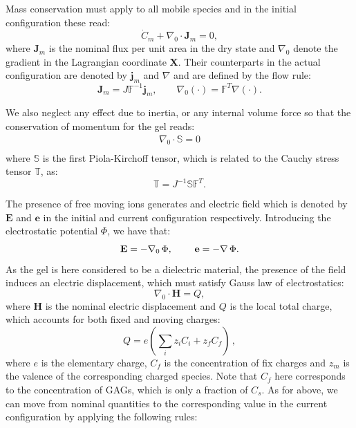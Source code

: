 \documentclass[runningheads]{llncs}
\newcommand{\F}{\ensuremath{\mathbb{F}}}
\begin{document}
Mass conservation must apply to all mobile species and in the initial configuration these read:
\begin{equation}
\dot{C}_m + \nabla_0 \cdot \mathbf{J}_m = 0, 
\end{equation}
where $\mathbf{J}_m$ is the nominal flux per unit area in the dry state and $\nabla_0$ denote the gradient in the Lagrangian coordinate $\mathbf{X}$. Their counterparts in the actual configuration are denoted by $\mathbf{j}_m$ and $\nabla$ and are defined by the flow rule:
\begin{equation}
\mathbf{J}_m = J \F^{-1} \mathbf{j}_m, \qquad \nabla_0 (\cdot) = \F^{T} \nabla(\cdot).
\end{equation}

We also neglect any effect due to inertia, or any internal volume force so that the conservation of momentum for the gel reads:
\begin{gather}
\nabla_0 \cdot \mathbb{S}=0\\
\end{gather}
where $\mathbb{S}$ is the first Piola-Kirchoff tensor, which is related to the Cauchy stress tensor $\mathbb{T}$, as:
\begin{equation}
\mathbb{T} = J^{-1}\mathbb{S}\F^T.
\end{equation}

The presence of free moving ions generates and electric field which is denoted by $\mathbf{E}$ and $\mathbf{e}$ in the initial and current configuration respectively. Introducing the electrostatic potential $\Phi$, we have that:
\begin{equation}
\mathbf{E}= -\nabla_0 \, \Phi, \hspace{8mm} \mathbf{e}= - \nabla \, \Phi.
\end{equation}
As the gel is here considered to be a dielectric material, the presence of the field induces an electric displacement, which must satisfy Gauss law of electrostatics:
\begin{equation}
\nabla_0 \cdot \mathbf{H}= Q,
\label{gauss}
\end{equation}
where $\mathbf{H}$ is the nominal electric displacement and $Q$ is the local total charge, which accounts for both fixed and moving charges:
\begin{equation}
Q = e\left(\sum\limits_{i} z_i C_i+z_f C_{f}\right)\, , 
\end{equation}
where $e$ is the elementary charge, $C_f$ is the concentration of fix charges and $z_m$ is the valence of the corresponding charged species. Note that $C_f$ here corresponds to the concentration of GAGs, which is only a fraction of $C_s$. As for above, we can move from nominal quantities to the corresponding value in the current configuration by applying the following rules:
\end{document}
